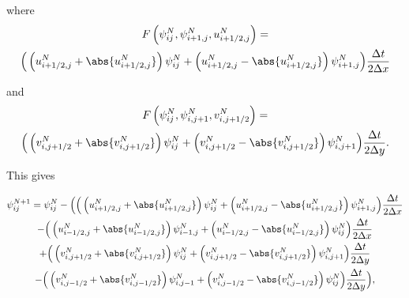 where
\begin{multline}
F \left( \psi_{ij}^N,\psi_{i+1,j}^N,u_{i+1/2,j}^N\right) =\\
\Big( \left( u_{i+1/2,j}^N + \abs{u_{i+1/2,j}^N} \right) \psi_{ij}^N
+ \left( u_{i+1/2,j}^N - \abs{u_{i+1/2,j}^N} \right) \psi_{i+1,j}^N \Big)
\frac{\Delta t}{2 \Delta x}
\end{multline}

and
\begin{multline}
F \left( \psi_{ij}^N,\psi_{i,j+1}^N,v_{i,j+1/2}^N\right) =\\
\Big( \left( v_{i,j+1/2}^N + \abs{v_{i,j+1/2}^N} \right) \psi_{ij}^N
+ \left( v_{i,j+1/2}^N - \abs{v_{i,j+1/2}^N} \right) \psi_{i,j+1}^N \Big)
\frac{\Delta t}{2 \Delta y}.
\end{multline}

This gives

\begin{multline}
 \psi_{ij}^{N+1} = \psi_{ij}^N - \Big( \Big( \left( u_{i+1/2,j}^N + \abs{u_{i+1/2,j}^N} \right) \psi_{ij}^N
+ \left( u_{i+1/2,j}^N - \abs{u_{i+1/2,j}^N} \right) \psi_{i+1,j}^N \Big)
\frac{\Delta t}{2 \Delta x} \\
-\Big( \left( u_{i-1/2,j}^N + \abs{u_{i-1/2,j}^N} \right) \psi_{i-1,j}^N
+ \left( u_{i-1/2,j}^N - \abs{u_{i-1/2,j}^N} \right) \psi_{ij}^N \Big)
\frac{\Delta t}{2 \Delta x} \\
 + \Big( \left( v_{i,j+1/2}^N + \abs{v_{i,j+1/2}^N} \right) \psi_{ij}^N
+ \left( v_{i,j+1/2}^N - \abs{v_{i,j+1/2}^N} \right) \psi_{i,j+1}^N \Big)
\frac{\Delta t}{2 \Delta y} \\
 -\Big( \left( v_{i,j-1/2}^N + \abs{v_{i,j-1/2}^N} \right) \psi_{i,j-1}^N
+ \left( v_{i,j-1/2}^N - \abs{v_{i,j-1/2}^N} \right) \psi_{ij}^N \Big)
\frac{\Delta t}{2 \Delta y} \Big),
\end{multline}